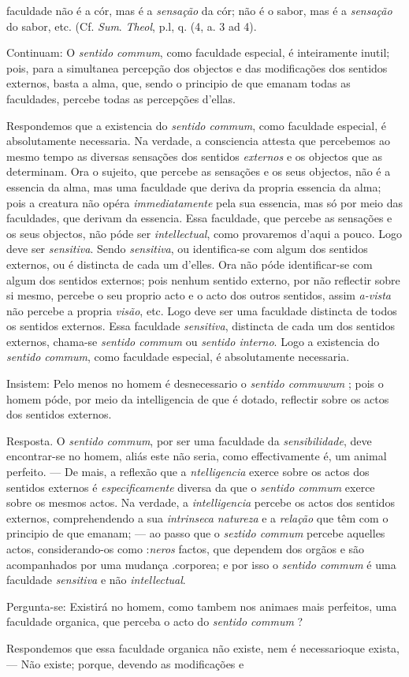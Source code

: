 faculdade não é a cór, mas é a \emph{sensação} da cór; não é o sabor, mas é a \emph{sensação} do sabor, etc. (Cf. \emph{Sum}. \emph{Theol}, p.l, q. (4, a. 3 ad 4).\par Continuam: O \emph{sentido commum}, como faculdade especial, é inteiramente inutil; pois, para a simultanea percepção dos objectos e das modificações dos sentidos externos, basta a alma, que, sendo o principio de que emanam todas as faculdades, percebe todas as percepções d'ellas.\par Respondemos que a existencia do \emph{sentido commum}, como faculdade especial, é absolutamente necessaria. Na verdade, a consciencia attesta que percebemos ao mesmo tempo as diversas sensações dos sentidos \emph{externos} e os objectos que as determinam. Ora o sujeito, que percebe as sensações e os seus objectos, não é a essencia da alma, mas uma faculdade que deriva da propria essencia da alma; pois a creatura não opéra \emph{immediatamente} pela sua essencia, mas só por meio das faculdades, que derivam da essencia. Essa faculdade, que percebe as sensações e os seus objectos, não póde ser \emph{intellectual}, como provaremos d'aqui a pouco. Logo deve ser \emph{sensitiva}. Sendo \emph{sensitiva}, ou identifica-se com algum dos sentidos externos, ou é distincta de cada um d'elles. Ora não póde identificar-se com algum dos sentidos externos; pois nenhum sentido externo, por não reflectir sobre si mesmo, percebe o seu proprio acto e o acto dos outros sentidos, assim \emph{a-vista} não percebe a propria \emph{visão}, etc. Logo deve ser uma faculdade distincta de todos os sentidos externos. Essa faculdade \emph{sensitiva}, distincta de cada um dos sentidos externos, chama-se \emph{sentido commum} ou \emph{sentido interno}. Logo a existencia do \emph{sentido commum}, como faculdade especial, é absolutamente necessaria.\par Insistem: Pelo menos no homem é desnecessario o \emph{sentido commuwum} ; pois o homem póde, por meio da intelligencia de que é dotado, reflectir sobre os actos dos sentidos externos.\par Resposta. O \emph{sentido commum}, por ser uma faculdade da \emph{sensibilidade}, deve encontrar-se no homem, aliás este não seria, como effectivamente é, um animal perfeito. --- De mais, a reflexão que a \emph{ntelligencia} exerce sobre os actos dos sentidos externos é \emph{especificamente} diversa da que o \emph{sentido commum} exerce sobre os mesmos actos. Na verdade, a \emph{intelligencia} percebe os actos dos sentidos externos, comprehendendo a sua \emph{intrinseca natureza} e a \emph{relação} que têm com o principio de que emanam; --- ao passo que o \emph{seztido commum} percebe aquelles actos, considerando-os como :\emph{neros} factos, que dependem dos orgãos e são acompanhados por uma mudança .corporea; e por isso o \emph{sentido commum} é uma faculdade \emph{sensitiva} e não \emph{intellectual}.\par Pergunta-se: Existirá no homem, como tambem nos animaes mais perfeitos, uma faculdade organica, que perceba o acto do \emph{sentido commum} ?\par Respondemos que essa faculdade organica não existe, nem é necessarioque exista, --- Não existe; porque, devendo as modificações e 